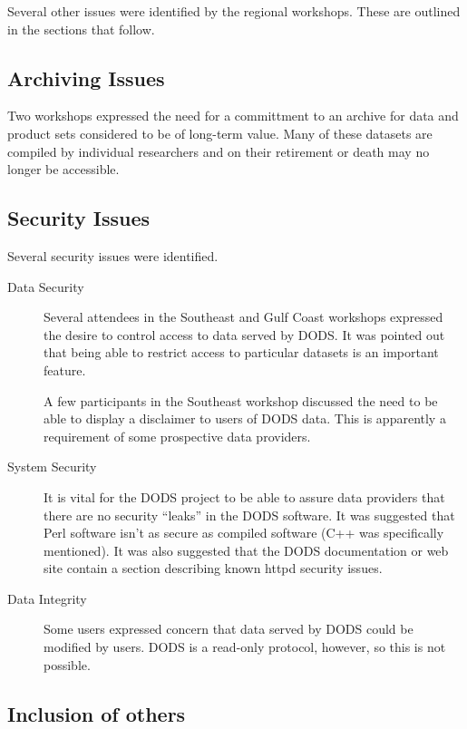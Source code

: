 \documentclass{report}
\begin{document}
Several other issues were identified by the regional workshops.  These
are outlined in the sections that follow.

\subsection{Archiving Issues}

Two workshops expressed the need for a committment to an archive for
data and product sets considered to be of long-term value.  Many of
these datasets are compiled by individual researchers and on their
retirement or death may no longer be accessible.

\subsection{Security Issues}

Several security issues were identified.

\begin{description}
\item[Data Security] Several attendees in the Southeast and Gulf Coast
  workshops expressed the desire to control access to data served by
  DODS.  It was pointed out that being able to restrict access to
  particular datasets is an important feature.  
  
  A few participants in the Southeast workshop discussed the need to
  be able to display a disclaimer to users of DODS data.
  This is apparently a requirement of some prospective data
  providers. 
  
\item[System Security] It is vital for the DODS project to be able to
  assure data providers that there are no security ``leaks'' in the
  DODS software.  It was suggested that Perl software isn't as secure
  as compiled software (C++ was specifically mentioned).  It was also
  suggested that the DODS documentation or web site contain a section
  describing known httpd security issues.
  
\item[Data Integrity] Some users expressed concern that data served by
  DODS could be modified by users.  DODS is a read-only protocol,
  however, so this is not possible.

\end{description}

\subsection{Inclusion of others}
\end{document}
